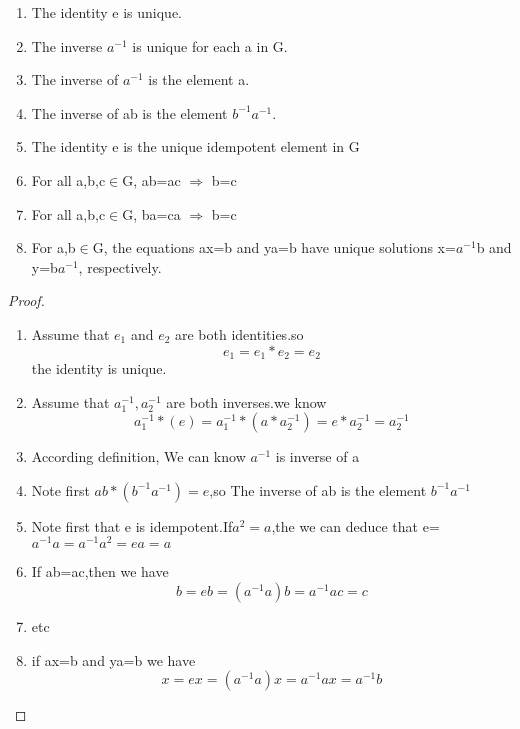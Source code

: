 \documentclass[cn,10pt,math=newtx,citestyle=gb7714-2015,bibstyle=gb7714-2015]{elegantbook}
\begin{document}
\begin{proposition}
    \begin{enumerate}
        \item The identity e is unique.
        \item The inverse $a^{-1}$ is unique for each a in G.
        \item The inverse of $a^{-1}$ is the element a.
        \item The inverse of ab is the element $b^{-1}$$a^{-1}$.
        \item The identity e is the unique idempotent element in G
        \item For all a,b,c$\in$G, ab=ac $\Rightarrow$ b=c
        \item For all a,b,c$\in$G, ba=ca $\Rightarrow$ b=c
        \item For a,b$\in$G, the equations ax=b and ya=b have unique solutions x=$a^{-1}$b and y=b$a^{-1}$, respectively.
    \end{enumerate}
\end{proposition}

\begin{proof}

\begin{enumerate}
    \item Assume that $e_1$ and $e_2$ are both identities.so
    \begin{equation*}
        e_1=e_1*e_2=e_2
    \end{equation*}
    the identity is unique.
    \item Assume that $a_1^{-1},a_2^{-1}$ are both inverses.we know
    \begin{equation*}
        a_1^{-1}*(e)=a_1^{-1}*(a*a_2^{-1})=e*a_2^{-1}=a_2^{-1}
    \end{equation*}
    \item According definition, We can know $a^{-1}$ is inverse of a
    \item Note first $ab*(b^{-1}a^{-1})=e$,so The inverse of ab is the element $b^{-1}$$a^{-1}$
    \item Note first that e is  idempotent.If$a^2=a$,the we can deduce that e=$a^{-1}a=a^{-1}a^2=ea=a$
    \item If ab=ac,then we have \begin{equation*}
        b=eb=(a^{-1}a)b=a^{-1}ac=c
    \end{equation*}
    \item etc
    \item if ax=b and ya=b we have \begin{equation*}
        x=ex=(a^{-1}a)x=a^{-1}ax=a^{-1}b
    \end{equation*}
 \end{enumerate}
    
\end{proof}
\end{document}
